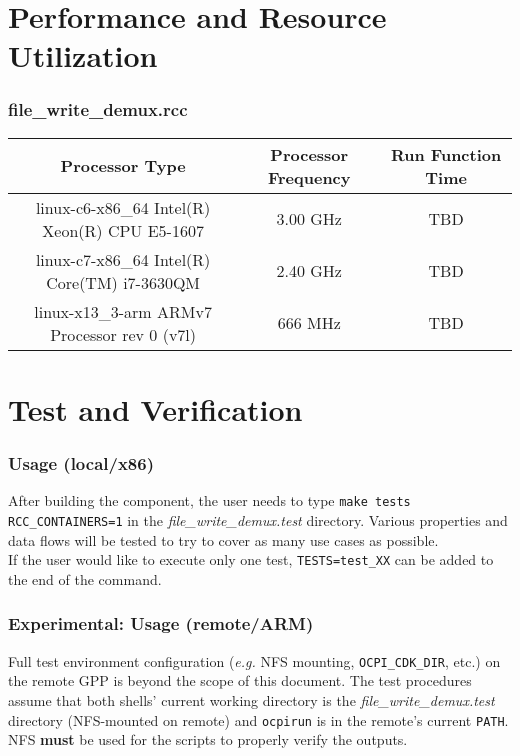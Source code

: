 \documentclass{article}
\def\comp{file\_write\_demux}
\begin{document}
\section*{Performance and Resource Utilization}
\subsubsection*{\comp.rcc}
\begin{scriptsize}
  \begin{tabular}{|c|c|c|}
    \hline
    \rowcolor{blue}
    Processor Type                                & Processor Frequency & Run Function Time \\
    \hline
    linux-c6-x86\_64 Intel(R) Xeon(R) CPU E5-1607 & 3.00 GHz            & TBD               \\
    \hline
    linux-c7-x86\_64 Intel(R) Core(TM) i7-3630QM  & 2.40 GHz            & TBD               \\
    \hline
    linux-x13\_3-arm ARMv7 Processor rev 0 (v7l)  & 666 MHz             & TBD               \\
    \hline
  \end{tabular}
\end{scriptsize}

\section*{Test and Verification}

\subsubsection*{Usage (local/x86)}
After building the component, the user needs to type \verb+make tests RCC_CONTAINERS=1+ in the \textit{file\_write\_demux.test} directory. Various properties and data flows will be tested to try to cover as many use cases as possible. \\

If the user would like to execute only one test, \verb+TESTS=test_XX+ can be added to the end of the command.

\subsubsection*{\textbf{Experimental}: Usage (remote/ARM)}
Full test environment configuration (\textit{e.g.} NFS mounting, \verb+OCPI_CDK_DIR+, etc.) on the remote GPP is beyond the scope of this document. The test procedures assume that both shells' current working directory is the \textit{file\_write\_demux.test} directory (NFS-mounted on remote) and \verb+ocpirun+ is in the remote's current \verb+PATH+. NFS \textbf{must} be used for the scripts to properly verify the outputs. \\
\end{document}
